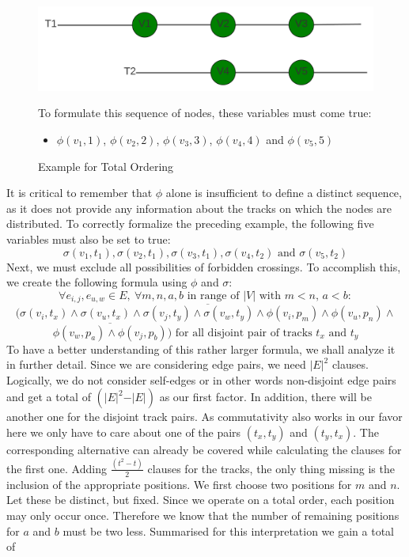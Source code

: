 \documentclass[bachelor, english]{algothesis}
\begin{document}
\begin{figure}[ht]
  \centering
  \begin{minipage}{0.6\textwidth}
    \includegraphics[width=\linewidth]{figures/Order_example.png}
  \caption{Example for Total Ordering}
  \label{fig:order_example_tot}
  \end{minipage}%
  \begin{minipage}{0.4\textwidth}
    To formulate this sequence of nodes, these variables must come true:
    \begin{itemize}
    \item  $\phi(v_1,1)$, $\phi(v_2,2)$, $\phi(v_3,3)$, $\phi(v_4,4)$ and $\phi(v_5,5)$
    \end{itemize}
  \end{minipage}
\end{figure}
\noindent
It is critical to remember that $\phi$ alone is insufficient to define a distinct sequence, as it does not provide any information about the tracks on which the nodes are distributed. To correctly formalize the preceding example, the following five variables must also be set to true:
$$\sigma(v_1, t_1), \sigma(v_2, t_1), \sigma(v_3, t_1), \sigma(v_4, t_2) \text{ and } \sigma(v_5, t_2)$$
\noindent
Next, we must exclude all possibilities of forbidden crossings. To accomplish this, we create the following formula using $\phi$ and $\sigma$:
    $$ \forall e_{i,j}, e_{u,w} \in E, \ \forall m,n,a,b \text{ in range of } \vert V \vert \text{ with } m<n, \, a<b:$$
    $$(\overline{\sigma(v_i,t_x) \land \sigma(v_u,t_x) \land \sigma(v_j,t_y) \land \sigma(v_w,t_y) \land \phi(v_i,p_m) \land \phi(v_u,p_n) \land}$$
    $$ \overline{\phi(v_w,p_a) \land \phi(v_j,p_b)})\text{ for all disjoint pair of tracks } t_x \text{ and } t_y $$
To have a better understanding of this rather larger formula, we shall analyze it in further detail. Since we are considering edge pairs, we need $\vert E \vert^2$ clauses. Logically, we do not consider self-edges or in other words non-disjoint edge pairs and get a total of $(\vert E \vert^2 - \vert E \vert)$ as our first factor. In addition, there will be another one for the disjoint track pairs. As  commutativity also works in our favor here we only have to care about one of the pairs $(t_x, t_y)$ and $(t_y, t_x)$. The corresponding alternative can already be covered while calculating the clauses for the first one. Adding $\frac{(t^2-t)}{2}$ clauses for the tracks, the only thing missing is the inclusion of the appropriate positions. We first choose two positions for $m$ and $n$. Let these be distinct, but fixed. Since we operate on a total order, each position may only occur once. Therefore we know that the number of remaining positions for $a$ and $b$ must be two less. Summarised for this interpretation we gain a total of
\end{document}
